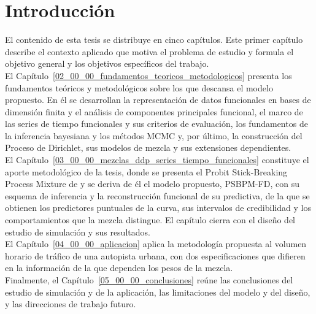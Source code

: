 \chapter{Introducción}
\label{01_00_00_introduccion}

El contenido de esta tesis se distribuye en cinco capítulos. Este primer capítulo describe el contexto aplicado que motiva el problema de estudio y formula el objetivo general y los objetivos específicos del trabajo.\\

El Capítulo~\ref{02_00_00_fundamentos_teoricos_metodologicos} presenta los fundamentos teóricos y metodológicos sobre los que descansa el modelo propuesto. En él se desarrollan la representación de datos funcionales en bases de dimensión finita y el análisis de componentes principales funcional, el marco de las series de tiempo funcionales y sus criterios de evaluación, los fundamentos de la inferencia bayesiana y los métodos MCMC y, por último, la construcción del Proceso de Dirichlet, sus modelos de mezcla y sus extensiones dependientes.\\

El Capítulo~\ref{03_00_00_mezclas_ddp_series_tiempo_funcionales} constituye el aporte metodológico de la tesis, donde se presenta el Probit Stick-Breaking Process Mixture de \citet{03_02_chung2009nonparametric} y se deriva de él el modelo propuesto, PSBPM-FD, con su esquema de inferencia y la reconstrucción funcional de su predictiva, de la que se obtienen los predictores puntuales de la curva, sus intervalos de credibilidad y los comportamientos que la mezcla distingue. El capítulo cierra con el diseño del estudio de simulación y sus resultados.\\

El Capítulo~\ref{04_00_00_aplicacion} aplica la metodología propuesta al volumen horario de tráfico de una autopista urbana, con dos especificaciones que difieren en la información de la que dependen los pesos de la mezcla.\\

Finalmente, el Capítulo~\ref{05_00_00_conclusiones} reúne las conclusiones del estudio de simulación y de la aplicación, las limitaciones del modelo y del diseño, y las direcciones de trabajo futuro.


